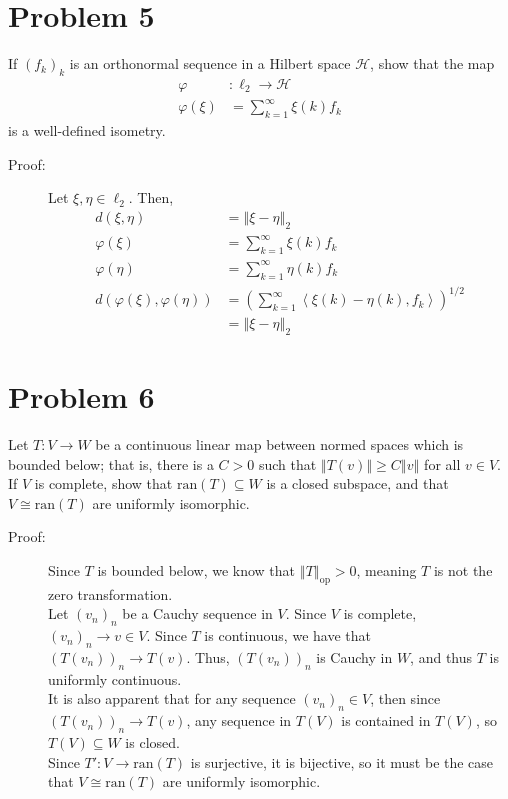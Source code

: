 \documentclass[10pt]{extarticle}
\newcommand{\iprod}[2]{\left\langle #1,#2\right\rangle}
\newcommand{\norm}[1]{\left\Vert #1\right\Vert}
\begin{document}
  \section{Problem 5}%
  If $(f_k)_k$ is an orthonormal sequence in a Hilbert space $\mathcal{H}$, show that the map
  \begin{align*}
    \varphi&: \ell_2 \rightarrow \mathcal{H}\\
    \varphi(\xi) &= \sum_{k=1}^{\infty}\xi(k)f_k
  \end{align*}
  is a well-defined isometry.
  \begin{description}
    \item[Proof:] Let $\xi,\eta\in \ell_2$. Then,
      \begin{align*}
        d(\xi,\eta) &= \norm{\xi-\eta}_2\\
        \varphi(\xi) &= \sum_{k=1}^{\infty}\xi(k)f_k\\
        \varphi(\eta) &= \sum_{k=1}^{\infty}\eta(k)f_k\\
        d(\varphi(\xi),\varphi(\eta)) &= \left(\sum_{k=1}^{\infty}\iprod{\xi(k)-\eta(k)}{f_k}\right)^{1/2}\\
                                      &=\norm{\xi - \eta}_2 \tag*{Parseval's Identity.}
      \end{align*}
  \end{description}
  \section{Problem 6}%
  Let $T: V\rightarrow W$ be a continuous linear map between normed spaces which is bounded below; that is, there is a $C > 0$ such that $\norm{T(v)} \geq C\norm{v}$ for all $v\in V$. If $V$ is complete, show that $\text{ran}(T)\subseteq W$ is a closed subspace, and that $V\cong \text{ran}(T)$ are uniformly isomorphic.
  \begin{description}
    \item[Proof:] Since $T$ is bounded below, we know that $\norm{T}_{\text{op}} > 0$, meaning $T$ is not the zero transformation.\\

      Let $(v_n)_n$ be a Cauchy sequence in $V$. Since $V$ is complete, $(v_n)_n \rightarrow v\in V$. Since $T$ is continuous, we have that $\left(T(v_n)\right)_n \rightarrow T(v)$. Thus, $\left(T(v_n)\right)_n$ is Cauchy in $W$, and thus $T$ is uniformly continuous.\\

      It is also apparent that for any sequence $(v_n)_n\in V$, then since $\left(T(v_n)\right)_n\rightarrow T(v)$, any sequence in $T(V)$ is contained in $T(V)$, so $T(V)\subseteq W$ is closed.\\

      Since $T': V\rightarrow \text{ran}(T)$ is surjective, it is bijective, so it must be the case that $V\cong \text{ran}(T)$ are uniformly isomorphic.
  \end{description}
\end{document}
